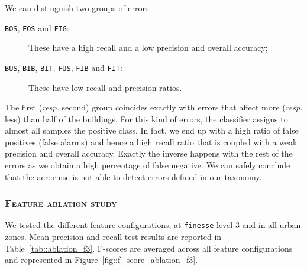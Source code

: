             We can distinguish two groups of errors: 
            \begin{description}
                \item[\texttt{BOS}, \texttt{FOS} and \texttt{FIG}:] These have a high recall and a low precision and overall accuracy;
                \item[\texttt{BUS}, \texttt{BIB}, \texttt{BIT}, \texttt{FUS}, \texttt{FIB} and \texttt{FIT}:] These have low recall and precision ratios.
            \end{description}
            The first (\textit{resp.} second) group coincides exactly with errors that affect more (\textit{resp.} less) than half of the buildings.
            For this kind of errors, the classifier assigns to almost all samples the positive class.
            In fact, we end up with a high ratio of false positives (false alarms) and hence a high recall ratio that is coupled with a weak precision and overall accuracy.
            Exactly the inverse happens with the rest of the errors as we obtain a high percentage of false negative.
            We can safely conclude that the \gls{acr::rmse} is not able to detect errors defined in our taxonomy.

        \subsubsection{\textsc{Feature ablation study}}
            \label{subsubsec::experiments::evaluation::baseline_feature_analysis::ablation}
            We tested the different feature configurations, at \texttt{finesse} level 3 and in all urban zones.
            Mean precision and recall test results are reported in Table~\ref{tab::ablation_f3}.
            F-scores are averaged across all feature configurations and represented in Figure~\ref{fig::f_score_ablation_f3}.\\

